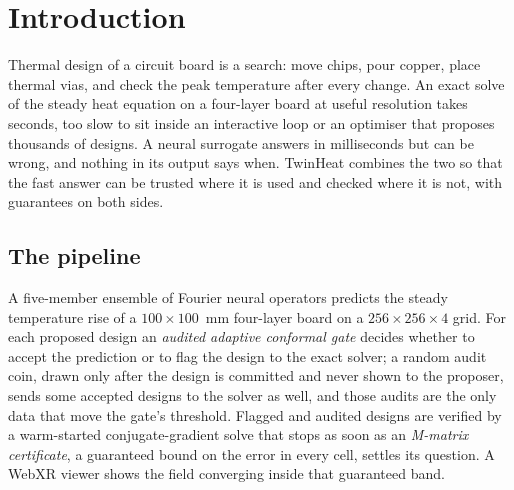 
\chapter{Introduction}
\label{ch:intro}

Thermal design of a circuit board is a search: move chips, pour copper, place thermal vias, and
check the peak temperature after every change. An exact solve of the steady heat equation on a
four-layer board at useful resolution takes seconds, too slow to sit inside an interactive loop or
an optimiser that proposes thousands of designs. A neural surrogate answers in milliseconds but
can be wrong, and nothing in its output says when. TwinHeat combines the two so that the fast
answer can be trusted where it is used and checked where it is not, with guarantees on both sides.

\section{The pipeline}
A five-member ensemble of Fourier neural operators predicts the steady temperature rise of a
$100\times100$~mm four-layer board on a $256\times256\times4$ grid. For each proposed design an
\emph{audited adaptive conformal gate} decides whether to accept the prediction or to flag the
design to the exact solver; a random audit coin, drawn only after the design is committed and
never shown to the proposer, sends some accepted designs to the solver as well, and those audits
are the only data that move the gate's threshold. Flagged and audited designs are verified by a
warm-started conjugate-gradient solve that stops as soon as an \emph{M-matrix certificate}, a
guaranteed bound on the error in every cell, settles its question. A WebXR viewer shows the field
converging inside that guaranteed band.

